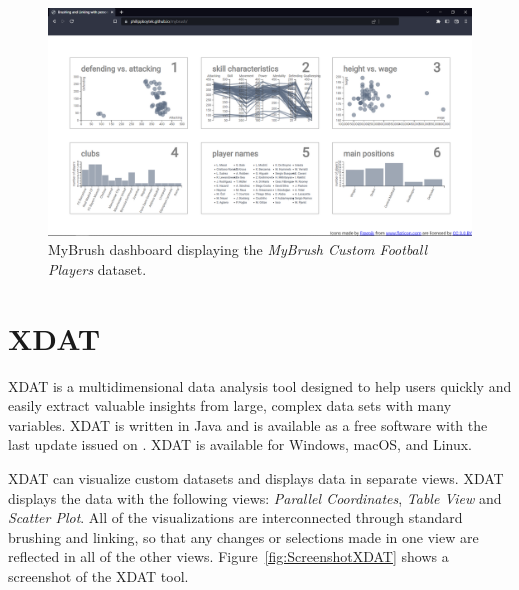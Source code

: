 \begin{figure}[tp]
\centering
\includegraphics[keepaspectratio,width=\linewidth,height=\halfh]
{images/screenshot-mybrush.png}

\caption[MyBrush Dashboard Screenshot]
{%
MyBrush dashboard displaying the \emph{MyBrush Custom Football Players} dataset.
}
\label{fig:ScreenshotMyBrush}
\end{figure}




\section{XDAT}

XDAT \parencite{XDAT} is a multidimensional data analysis tool designed to
help users quickly and easily extract valuable insights from large,
complex data sets with many variables. XDAT is written in Java and is
available as a free software with the last update issued on
. XDAT is available for Windows, macOS, and
Linux.

XDAT can visualize custom datasets and displays data in separate views.
XDAT displays the data with the following views: \emph{Parallel
Coordinates}, \emph{Table View} and \emph{Scatter Plot}. All of the
visualizations are interconnected through standard brushing and linking,
so that any changes or selections made in one view are reflected in all of
the other views. Figure~\ref{fig:ScreenshotXDAT} shows a screenshot of the
XDAT tool.




